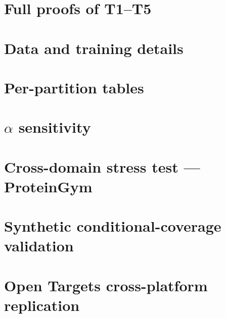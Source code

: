 \documentclass{article}
\begin{document}





\appendix

\section{Full proofs of T1--T5}
\label{app:proofs}


\section{Data and training details}
\label{app:data}


\section{Per-partition tables}
\label{app:tables}


\section{$\alpha$ sensitivity}
\label{app:alpha}


\section{Cross-domain stress test --- ProteinGym}
\label{app:proteingym}


\section{Synthetic conditional-coverage validation}
\label{app:synthetic}


\section{Open Targets cross-platform replication}
\label{app:open_targets}



\end{document}
